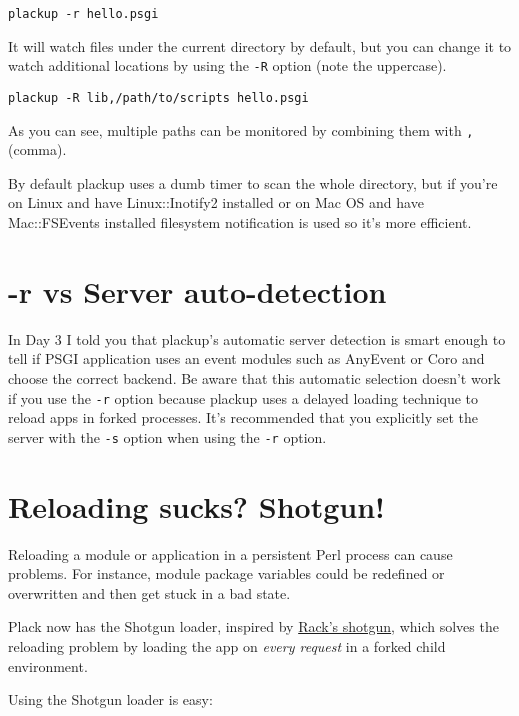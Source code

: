 \begin{lstlisting}
plackup -r hello.psgi
\end{lstlisting}

It will watch files under the current directory by default, but you can
change it to watch additional locations by using the \lstinline!-R!
option (note the uppercase).

\begin{lstlisting}
plackup -R lib,/path/to/scripts hello.psgi
\end{lstlisting}

As you can see, multiple paths can be monitored by combining them with
\lstinline!,! (comma).

By default plackup uses a dumb timer to scan the whole directory, but if
you're on Linux and have Linux::Inotify2 installed or on Mac OS and have
Mac::FSEvents installed filesystem notification is used so it's more
efficient.

\section{-r vs Server
auto-detection}\label{r-vs-server-auto-detection}

In Day 3 I told you that plackup's automatic server detection is smart
enough to tell if PSGI application uses an event modules such as
AnyEvent or Coro and choose the correct backend. Be aware that this
automatic selection doesn't work if you use the \lstinline!-r! option
because plackup uses a delayed loading technique to reload apps in
forked processes. It's recommended that you explicitly set the server
with the \lstinline!-s! option when using the \lstinline!-r! option.

\section{Reloading sucks? Shotgun!}\label{reloading-sucks-shotgun}

Reloading a module or application in a persistent Perl process can cause
problems. For instance, module package variables could be redefined or
overwritten and then get stuck in a bad state.

Plack now has the Shotgun loader, inspired by
\href{http://github.com/rtomayko/shotgun}{Rack's shotgun}, which solves
the reloading problem by loading the app on \emph{every request} in a
forked child environment.

Using the Shotgun loader is easy:


